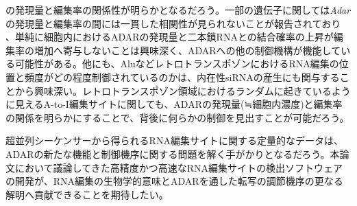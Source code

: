 の発現量と編集率の関係性が明らかとなるだろう。一部の遺伝子に関しては\textit{Adar}の発現量と編集率の間には一貫した相関性が見られないことが報告されており \citep{Dominissini:2011aa}、単純に細胞内におけるADARの発現量と二本鎖RNAとの結合確率の上昇が編集率の増加へ寄与しないことは興味深く、ADARへの他の制御機構が機能している可能性がある。他にも、AluなどレトロトランスポゾンにおけるRNA編集の位置と頻度がどの程度制御されているのかは、内在性siRNAの産生にも関与することから興味深い。レトロトランスポゾン領域におけるランダムに起きているように見えるA-to-I編集サイトに関しても、ADARの発現量(≒細胞内濃度)と編集率の関係を明らかにすることで、背後に何らかの制御を見出すことが可能だろう。
\par
超並列シーケンサーから得られるRNA編集サイトに関する定量的なデータは、ADARの新たな機能と制御機序に関する問題を解く手がかりとなるだろう。本論文において議論してきた高精度かつ高速なRNA編集サイトの検出ソフトウェアの開発が、RNA編集の生物学的意味とADARを通した転写の調節機序の更なる解明へ貢献できることを期待したい。
